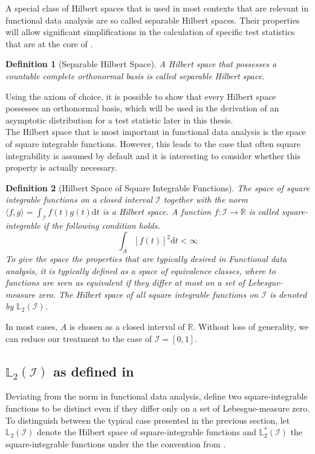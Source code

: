 \documentclass[12pt, a4paper]{article}
\theoremstyle{MAstyle} \newtheorem{assumption}{Assumption}[section]
\theoremstyle{MAstyle} \newtheorem{definition}{Definition}[section]
\theoremstyle{MAstyle} \newtheorem{theorem}{Theorem}[section]
\begin{document}
			A special class of Hilbert spaces that is used in most contexts that are relevant in functional data analysis are so called separable Hilbert spaces. Their properties will allow significant simplifications in the calculation of specific test statistics that are at the core of \cite{bugni_permutation_2021}.
			\begin{definition}[Separable Hilbert Space]
				A Hilbert space that possesses a countable complete orthonormal basis is called separable Hilbert space.
			\end{definition}
			Using the axiom of choice, it is possible to show that every Hilbert space possesses an orthonormal basis, which will be used in the derivation of an asymptotic distribution for a test statistic later in this thesis.\\
			
			The Hilbert space that is most important in functional data analysis is the space of square integrable functions. However, this leads to the case that often square integrability is assumed by default and it is interesting to consider whether this property is actually necessary.		
			\begin{definition}[Hilbert Space of Square Integrable Functions]
				
				The space of square integrable functions on a closed interval $\mathcal{I}$ together with the norm $\langle f,g\rangle = \int_{\mathcal{I}} f(t)g(t) \mathrm{d}t$ is a Hilbert space.
				A function $f: \mathcal{I} \rightarrow \mathbb{R}$ is called square-integrable if the following condition holds.
				\begin{equation}
					\int_{A} \left[f(t)\right]^2\mathrm{d}t < \infty
				\end{equation}
				To give the space the properties that are typically desired in Functional data analysis, it is typically defined as a space of equivalence classes, where to functions are seen as equivalent if they differ at most on a set of Lebesgue-measure zero. The Hilbert space of all square integrable functions on $\mathcal{I}$ is denoted by $\mathbb{L}_2(\mathcal{I})$.
			\end{definition}
			
			In most cases, $A$ is chosen as a closed interval of $\mathbb{R}$. Without loss of generality, we can reduce our treatment to the case of $\mathcal{I} = [0,1]$.
			
			\subsection{$\mathbb{L}_2(\mathcal{I})$ as defined in \cite{bugni_permutation_2021}}
			Deviating from the norm in functional data analysis, \cite{bugni_permutation_2021} define two square-integrable functions to be distinct even if they differ only on a set of Lebesgue-measure zero. To distinguish between the typical case presented in the previous section, let $\mathbb{L}_2(\mathcal{I})$ denote the Hilbert space of square-integrable functions and $\mathbb{L}^{*}_2(\mathcal{I})$ the square-integrable functions under the the convention from \cite{bugni_permutation_2021}.\\
			
\end{document}
